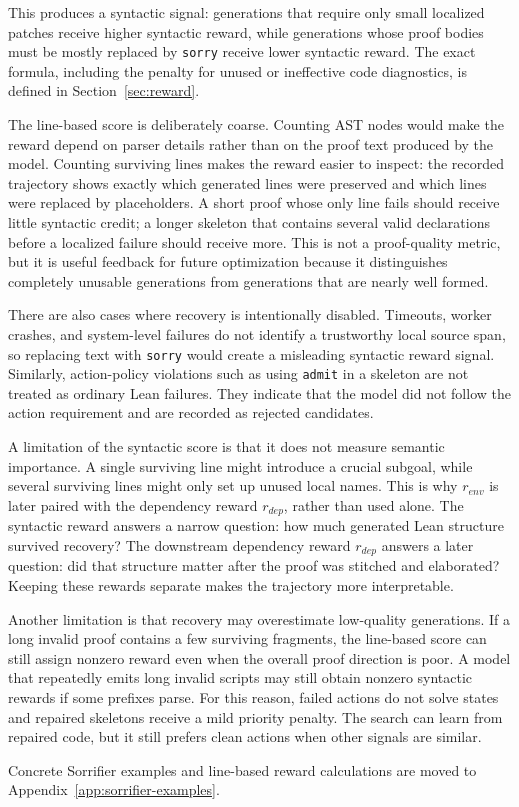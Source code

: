 This produces a syntactic signal: generations that require only small localized patches
receive higher syntactic reward, while generations whose proof bodies must be mostly replaced by \texttt{sorry}
receive lower syntactic reward. The exact formula, including the penalty for unused or ineffective code diagnostics,
is defined in Section~\ref{sec:reward}.

The line-based score is deliberately coarse. Counting AST nodes would make the reward depend on parser details rather than on the proof text produced by the model. 
Counting surviving lines makes the reward easier to inspect: the recorded trajectory shows exactly which generated lines were preserved and which lines were replaced by placeholders. 
A short proof whose only line fails should receive little syntactic credit; a longer skeleton that contains several valid declarations before a
localized failure should receive more. This is not a proof-quality metric, but it is useful feedback for
future optimization because it distinguishes completely unusable generations from generations that are
nearly well formed.

There are also cases where recovery is intentionally disabled. Timeouts, worker crashes, and system-level
failures do not identify a trustworthy local source span, so replacing text with \texttt{sorry} would create a
misleading syntactic reward signal. Similarly, action-policy violations such as using \texttt{admit} in a skeleton are
not treated as ordinary Lean failures. They indicate that the model did not follow the action requirement and
are recorded as rejected candidates.

A limitation of the syntactic score is that it does not measure semantic importance. A single surviving
line might introduce a crucial subgoal, while several surviving lines might only set up unused
local names. This is why \(r_{env}\) is later paired with the dependency reward \(r_{dep}\), rather than used alone. The
syntactic reward answers a narrow question: how much generated Lean structure survived recovery?
The downstream dependency reward \(r_{dep}\) answers a later question: did that structure matter after the proof was stitched
and elaborated? Keeping these rewards separate makes the trajectory more interpretable.

Another limitation is that recovery may overestimate low-quality generations. If a long invalid proof contains a few surviving fragments, the line-based score can still assign nonzero reward even when the overall proof direction is poor. 
A model that repeatedly emits long invalid scripts may still obtain nonzero syntactic rewards if some prefixes
parse. For this reason, failed actions do not solve states and repaired skeletons receive a mild priority
penalty. The search can learn from repaired code, but it still prefers clean actions when other signals are
similar.


Concrete Sorrifier examples and line-based reward calculations are moved to Appendix~\ref{app:sorrifier-examples}.
